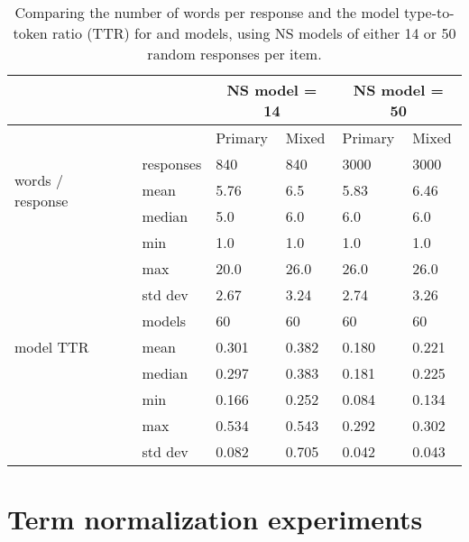 \begin{table}[htb!]
\begin{center}
\setlength{\tabcolsep}{.6em}
\begin{tabular}{|l|l||l|l||l|l|}
\hline
 && \multicolumn{2}{c||}{NS model = 14} & \multicolumn{2}{c|}{NS model = 50} \\
\hline
	&	& Primary 	& Mixed 	& Primary 	& Mixed  	\\
\hline
\multirow{3}{*}{\begin{sideways}words / response~ \end{sideways}} & responses & 840 & 840 & 3000 & 3000  \\
\cline{2-6}
& mean 		& 5.76 	& 6.5		& 5.83 	& 6.46	 \\
\cline{2-6}
& median 	& 5.0 	& 6.0		& 6.0 	& 6.0	\\
\cline{2-6}
& min 		& 1.0 	& 1.0		& 1.0 	& 1.0	 \\
\cline{2-6}
& max 		& 20.0 	& 26.0		& 26.0 	& 26.0	 \\
\cline{2-6}
& std dev 	& 2.67 	& 3.24		& 2.74 	& 3.26	 \\
\hline
\hline
\multirow{3}{*}{\begin{sideways} model TTR~ \end{sideways}} & models	& 60  & 60 & 60 & 60  \\
\cline{2-6}
& mean 		& 0.301 	& 0.382		& 0.180 	& 0.221	 \\
\cline{2-6}
& median 	& 0.297 	& 0.383		& 0.181 	& 0.225	\\
\cline{2-6}
& min 		& 0.166 	& 0.252		& 0.084 	& 0.134	 \\
\cline{2-6}
& max 		& 0.534 	& 0.543		& 0.292 	& 0.302	 \\
\cline{2-6}
& std dev 	& 0.082 	& 0.705		& 0.042 	& 0.043	 \\
\hline
\end{tabular}
\caption{\label{tab:primacy-model-stats}Comparing the number of words per response and the model type-to-token ratio (TTR) for  and  models, using NS models of either 14 or 50 random responses per item.
}
\end{center}
\end{table}




\section{Term normalization experiments}
\label{sec:exp-term-norm}

